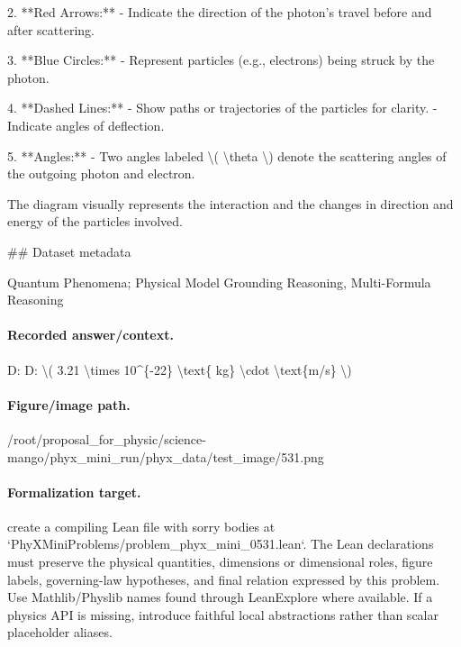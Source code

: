 2. **Red Arrows:**
   - Indicate the direction of the photon's travel before and after scattering.

3. **Blue Circles:**
   - Represent particles (e.g., electrons) being struck by the photon.

4. **Dashed Lines:**
   - Show paths or trajectories of the particles for clarity.
   - Indicate angles of deflection.

5. **Angles:**
   - Two angles labeled \textbackslash{}( \textbackslash{}theta \textbackslash{}) denote the scattering angles of the outgoing photon and electron.

The diagram visually represents the interaction and the changes in direction and energy of the particles involved.

\#\# Dataset metadata

Quantum Phenomena; Physical Model Grounding Reasoning, Multi-Formula Reasoning

\paragraph{Recorded answer/context.}
D: D: \textbackslash{}( 3.21 \textbackslash{}times 10\textasciicircum{}\{-22\} \textbackslash{}text\{ kg\} \textbackslash{}cdot \textbackslash{}text\{m/s\} \textbackslash{})

\paragraph{Figure/image path.}
/root/proposal\_for\_physic/science-mango/phyx\_mini\_run/phyx\_data/test\_image/531.png

\paragraph{Formalization target.}
create a compiling Lean file with sorry bodies at `PhyXMiniProblems/problem\_phyx\_mini\_0531.lean`. The Lean declarations must preserve the physical quantities, dimensions or dimensional roles, figure labels, governing-law hypotheses, and final relation expressed by this problem.
Use Mathlib/Physlib names found through LeanExplore where available. If a physics API is missing, introduce faithful local abstractions rather than scalar placeholder aliases.

